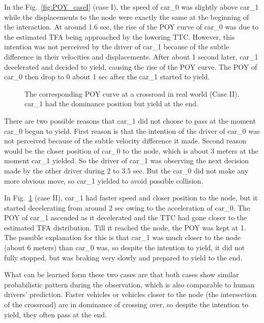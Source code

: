 In the Fig.~\ref{fig:POY_caseI} (case I), the speed of car\_0 was slightly above car\_1 while the displacements to the node were exactly the same at the beginning of the interaction. At around 1.6 sec, the rise of the POY curve of car\_0 was due to the estimated TFA being approached by the lowering TTC. However, this intention was not perceived by the driver of car\_1 because of the subtle difference in their velocities and displacements. After about 1 second later, car\_1 decelerated and decided to yield, causing the rise of the POY curve. The POY of car\_0 then drop to 0 about 1 sec after the car\_1 started to yield. 

\begin{figure}[htbp!]
\begin{center}
\end{center}
\caption{The corresponding POY curve at a crossroad in real world (Case II). car\_1 had the dominance position but yield at the end.}
\label{fig:POY_caseII} 
\end{figure}

There are two possible reasons that car\_1 did not choose to pass at the moment car\_0 begun to yield. First reason is that the intention of the driver of car\_0 was not perceived because of the subtle velocity difference it made. Second reason would be the closer position of car\_0 to the node, which is about 3 meters at the moment car\_1 yielded. So the driver of car\_1 was observing the next decision made by the other driver during 2 to 3.5 sec. But the car\_0 did not make any more obvious move, so car\_1 yielded to avoid possible collision.

In Fig.~\ref{fig:POY_caseII} (case II), car\_1 had faster speed and closer position to the node, but it started decelerating from around 2 sec owing to the acceleration of car\_0. The POY of car\_1 ascended as it decelerated and the TTC had gone closer to the estimated TFA distribution. Till it reached the node, the POY was kept at 1. The possible explanation for this is that car\_1 was much closer to the node (about 6 meters) than car\_0 was, so despite the intention to yield, it did not fully stopped, but was braking very slowly and prepared to yield to the end. 

What can be learned form these two cases are that both cases show similar probabilistic pattern during the observation, which is also comparable to human drivers' prediction. Faster vehicles or vehicles closer to the node (the intersection of the crossroad) are in dominance of crossing over, so despite the intention to yield, they often pass at the end. 

